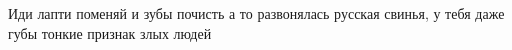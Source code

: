  
 
 
 
 

Иди лапти поменяй и зубы почисть а то развонялась русская свинья, у тебя даже
губы тонкие признак злых людей
